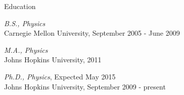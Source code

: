 \newlength{\oldcvlabelwidth}
\newlength{\oldcvlabelsep}

\setlength{\oldcvlabelwidth}{\cvlabelwidth}
\setlength{\oldcvlabelsep}{\cvlabelsep}

\setlength{\cvlabelwidth}{1em}

\begin{cvlist}{Education}
\item \emph{B.S., Physics}\\
Carnegie Mellon University, September 2005 - June 2009
\item \emph{M.A., Physics}\\
Johns Hopkins University, 2011
\item \emph{Ph.D., Physics}, Expected May 2015\\
  Johns Hopkins University, September 2009 - present  
\end{cvlist}

\setlength{\cvlabelwidth}{0em}
\setlength{\cvlabelsep}{\labelsep}


